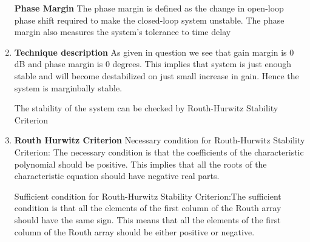 \begin{enumerate}[label=\thesection.\arabic*.,ref=\thesection.\theenumi]
\textbf{Phase Margin}
The phase margin is defined as the change in open-loop phase shift required to make the closed-loop system unstable. The phase margin also measures the system's tolerance to time delay







\item
\textbf{Technique description}
As given in question we see that gain margin is 0 dB and phase margin is 0 degrees. This implies that system is just enough stable and will become destabilized on just small increase in gain. Hence the system is marginbally stable.


The stability of the system can be checked by Routh-Hurwitz Stability Criterion 


\item
\textbf{Routh Hurwitz Criterion}
Necessary condition for Routh-Hurwitz Stability Criterion: The necessary condition is that the coefficients of the characteristic polynomial should be positive. This implies that all the roots of the characteristic equation should have negative real parts.

Sufficient condition for Routh-Hurwitz Stability Criterion:The sufficient condition is that all the elements of the first column of the Routh array should have the same sign. This means that all the elements of the first column of the Routh array should be either positive or negative.\vspace{16pt}



\end{enumerate}
